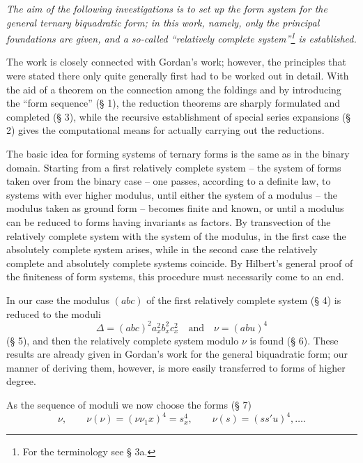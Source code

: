 \documentclass[11pt]{article}
\begin{document}
\emph{The aim of the following investigations is to set up the form system for the general ternary biquadratic form; in this work, namely, only the principal foundations are given, and a so-called ``relatively complete system''\footnote{For the terminology see § 3a.} is established.}

The work is closely connected with Gordan's work; however, the principles that were stated there only quite generally first had to be worked out in detail. With the aid of a theorem on the connection among the foldings and by introducing the ``form sequence'' (§ 1), the reduction theorems are sharply formulated and completed (§ 3), while the recursive establishment of special series expansions (§ 2) gives the computational means for actually carrying out the reductions.

The basic idea for forming systems of ternary forms is the same as in the binary domain. Starting from a first relatively complete system -- the system of forms taken over from the binary case -- one passes, according to a definite law, to systems with ever higher modulus, until either the system of a modulus -- the modulus taken as ground form -- becomes finite and known, or until a modulus can be reduced to forms having invariants as factors. By transvection of the relatively complete system with the system of the modulus, in the first case the absolutely complete system arises, while in the second case the relatively complete and absolutely complete systems coincide. By Hilbert's general proof of the finiteness of form systems, this procedure must necessarily come to an end.

In our case the modulus $(abc)$ of the first relatively complete system (§ 4) is reduced to the moduli
\[
\Delta=(abc)^2a_x^2b_x^2c_x^2\quad\text{and}\quad \nu=(abu)^4
\]
(§ 5), and then the relatively complete system modulo $\nu$ is found (§ 6). These results are already given in Gordan's work for the general biquadratic form; our manner of deriving them, however, is more easily transferred to forms of higher degree.

As the sequence of moduli we now choose the forms (§ 7)
\[
\nu,\qquad \nu(\nu)=(\nu\nu_1x)^4=s_x^4,\qquad \nu(s)=(ss'u)^4,\ldots .
\]
\end{document}
